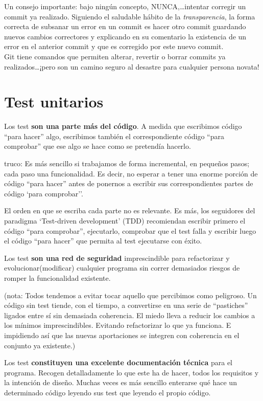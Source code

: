 \documentclass[spanish,12pt,a4paper,final,oneside]{book}
\begin{document}
Un consejo importante: bajo ningún concepto, NUNCA,\ldots intentar corregir un commit ya realizado. Siguiendo el saludable hábito de la \textit{transparencia}, la forma correcta de subsanar un error en un commit es hacer otro commit guardando nuevos cambios correctores y explicando en su comentario la existencia de un error en el anterior commit y que es corregido por este nuevo commit.
\\Git tiene comandos que permiten alterar, revertir o borrar commits ya realizados\ldots ¡pero son un camino seguro al desastre para cualquier persona novata!



\section{Test unitarios}
Los test \textbf{son una parte más del código}. A medida que escribimos código ``para hacer'' algo, escribimos también el correspondiente código ``para comprobar'' que ese algo se hace como se pretendía hacerlo. 

truco: Es más sencillo si trabajamos de forma incremental, en pequeños pasos; cada paso una funcionalidad. Es decir, no esperar a tener una enorme porción de código ``para hacer'' antes de ponernos a escribir sus correspondientes partes de código `para comprobar''.

El orden en que se escriba cada parte no es relevante. Es más, los seguidores del paradigma `Test-driven development' (TDD) recomiendan escribir primero el código ``para comprobar'', ejecutarlo, comprobar que el test falla y escribir luego el código ``para hacer'' que permita al test ejecutarse con éxito.

Los test \textbf{son una red de seguridad} imprescindible para refactorizar y evolucionar(modificar) cualquier programa sin correr demasiados riesgos de romper la funcionalidad existente.

(nota: Todos tendemos a evitar tocar aquello que percibimos como peligroso. Un código sin test tiende, con el tiempo, a convertirse en una serie de ``pastiches'' ligados entre sí sin demasiada coherencia. El miedo lleva a reducir los cambios a los mínimos imprescindibles. Evitando refactorizar lo que ya funciona. E impidiendo así que las nuevas aportaciones se integren con coherencia en el conjunto ya existente.)

Los test \textbf{constituyen una excelente documentación técnica} para el programa. Recogen detalladamente lo que este ha de hacer, todos los requisitos y la intención de diseño. Muchas veces es más sencillo enterarse qué hace un determinado código leyendo sus test que leyendo el propio código. 
\end{document}
